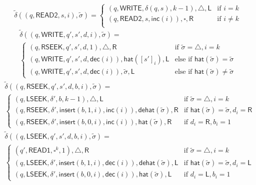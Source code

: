 \documentclass[12pt]{article}
\begin{document}
$$
\tilde{\delta}((q, \textsf{READ2}, s, i), \tilde{\sigma}) =
\begin{cases}
(q, \textsf{WRITE}, \delta(q, s), k-1), \triangle, \textsf{L} & \text{if } i = k \\
(q, \textsf{READ2}, s, \textsf{inc}(i)), \square, \textsf{R} & \text{if } i \neq k \\
\end{cases}
$$
\begin{multline*}
\tilde{\delta}((q, \textsf{WRITE}, q', s', d, i), \tilde{\sigma}) = \\
\begin{cases}
(q, \textsf{RSEEK}, q', s', d, 1), \triangle, \textsf{R} & \text{if } \tilde{\sigma} = \triangle, i = k \\
(q, \textsf{WRITE}, q', s', d, \textsf{dec}(i)), \textsf{hat}([s']_i), \textsf{L} & \text{else if } \textsf{hat}(\tilde{\sigma}) = \tilde{\sigma} \\
(q, \textsf{WRITE}, q', s', d, \textsf{dec}(i)), \tilde{\sigma}, \textsf{L} & \text{else if } \textsf{hat}(\tilde{\sigma}) \neq \tilde{\sigma}
\end{cases}
\end{multline*}
\begin{multline*}
\tilde{\delta}((q, \textsf{RSEEK}, q', s', d, b, i), \tilde{\sigma}) = \\
\begin{cases}
(q, \textsf{LSEEK}, \delta', b, k-1), \triangle, \textsf{L} & \text{if } \tilde{\sigma} = \triangle, i = k \\
(q, \textsf{RSEEK}, \delta', \textsf{insert}(b, 1, i), \textsf{inc}(i)), \textsf{dehat}(\tilde{\sigma}), \textsf{R} & \text{if } \textsf{hat}(\tilde{\sigma}) = \tilde{\sigma}, d_i = \textsf{R} \\
(q, \textsf{RSEEK}, \delta', \textsf{insert}(b, 0, i), \textsf{inc}(i)), \textsf{hat}(\tilde{\sigma}), \textsf{R} & \text{if } d_i = \textsf{R}, b_i = 1
\end{cases}
\end{multline*}
\begin{multline*}
\tilde{\delta}((q, \textsf{LSEEK}, q', s', d, b, i), \tilde{\sigma}) = \\
\begin{cases}
(q', \textsf{READ1}, \square^k, 1), \triangle, \textsf{R} & \text{if } \tilde{\sigma} = \triangle, i = k \\
(q, \textsf{LSEEK}, \delta', \textsf{insert}(b, 1, i), \textsf{dec}(i)), \textsf{dehat}(\tilde{\sigma}), \textsf{L} & \text{if } \textsf{hat}(\tilde{\sigma}) = \tilde{\sigma}, d_i = \textsf{L} \\
(q, \textsf{LSEEK}, \delta', \textsf{insert}(b, 0, i), \textsf{dec}(i)), \textsf{hat}(\tilde{\sigma}), \textsf{L} & \text{if } d_i = \textsf{L}, b_i = 1
\end{cases}
\end{multline*}
\end{document}
